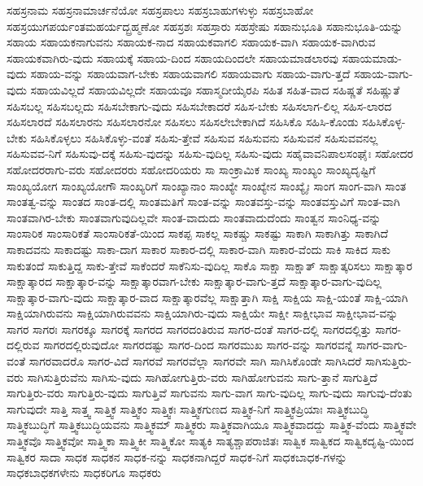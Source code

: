 {ಸಹಸ್ರನಾಮ
ಸಹಸ್ರನಾಮಾರ್ಚನೆಯೋ
ಸಹಸ್ರಪಾಲು
ಸಹಸ್ರಬಾಹುಗಳುಳ್ಳು
ಸಹಸ್ರಬಾಹೋ
ಸಹಸ್ರಯುಗಪರ್ಯಂತಮಹರ್ಯದ್ಬ್ರಹ್ಮಣೋ
ಸಹಸ್ರಶಃ
ಸಹಸ್ರಾರು
ಸಹಸ್ರೇಷು
ಸಹಾನುಭೂತಿ
ಸಹಾನುಭೂತಿ-ಯನ್ನು
ಸಹಾಯ
ಸಹಾಯಕನಾಗುವನು
ಸಹಾಯಕ-ನಾದ
ಸಹಾಯಕವಾಗಲಿ
ಸಹಾಯಕ-ವಾಗಿ
ಸಹಾಯಕ-ವಾಗಿರುವ
ಸಹಾಯಕವಾಗಿರು-ವುದು
ಸಹಾಯಕ್ಕೆ
ಸಹಾಯ-ದಿಂದ
ಸಹಾಯದಿಂದಲೇ
ಸಹಾಯಮಾಡಲಾರವು
ಸಹಾಯಮಾಡು-ವುದು
ಸಹಾಯ-ವನ್ನು
ಸಹಾಯವಾಗ-ಬೇಕು
ಸಹಾಯವಾಗಲಿ
ಸಹಾಯವಾಗು
ಸಹಾಯ-ವಾಗು-ತ್ತದೆ
ಸಹಾಯ-ವಾಗು-ವುದು
ಸಹಾಯವಿಲ್ಲದೆ
ಸಹಾಯವಿಲ್ಲದೇ
ಸಹಾಯವೂ
ಸಹಾಸ್ಮದೀಯೈರಪಿ
ಸಹಿತ
ಸಹಿತ-ವಾದ
ಸಹಿಷ್ಣತೆ
ಸಹಿಷ್ಣುತೆ
ಸಹಿಸಬಲ್ಲ
ಸಹಿಸಬಲ್ಲದು
ಸಹಿಸಬೇಕಾಗು-ವುದು
ಸಹಿಸಬೇಕಾದರೆ
ಸಹಿಸ-ಬೇಕು
ಸಹಿಸಲಾಗ-ಲಿಲ್ಲ
ಸಹಿಸ-ಲಾರದ
ಸಹಿಸಲಾರದೆ
ಸಹಿಸಲಾರನು
ಸಹಿಸಲಾರನೋ
ಸಹಿಸಲು
ಸಹಿಸಲೇಬೇಕಾಗಿದೆ
ಸಹಿಸಿಕೊ
ಸಹಿಸಿ-ಕೊಂಡು
ಸಹಿಸಿಕೊಳ್ಳ-ಬೇಕು
ಸಹಿಸಿಕೊಳ್ಳಲು
ಸಹಿಸಿಕೊಳ್ಳು-ವಂತೆ
ಸಹಿಸು-ತ್ತೇವೆ
ಸಹಿಸುವ
ಸಹಿಸುವನು
ಸಹಿಸುವನೆ
ಸಹಿಸುವವನಲ್ಲ
ಸಹಿಸುವವ-ನಿಗೆ
ಸಹಿಸುವು-ದಕ್ಕೆ
ಸಹಿಸು-ವುದನ್ನು
ಸಹಿಸು-ವುದಿಲ್ಲ
ಸಹಿಸು-ವುದು
ಸಹೈವಾವನಿಪಾಲಸಂಘೈಃ
ಸಹೋದರ
ಸಹೋದರರಾಗು-ವರು
ಸಹೋದರರು
ಸಹೋದರಿಯರು
ಸಾ
ಸಾಂಕ್ರಾಮಿಕ
ಸಾಂಖ್ಯ
ಸಾಂಖ್ಯಂ
ಸಾಂಖ್ಯದೃಷ್ಟಿಗೆ
ಸಾಂಖ್ಯಯೋಗ
ಸಾಂಖ್ಯಯೋಗೌ
ಸಾಂಖ್ಯರಿಗೆ
ಸಾಂಖ್ಯಾನಾಂ
ಸಾಂಖ್ಯೇ
ಸಾಂಖ್ಯೇನ
ಸಾಂಖ್ಯೈಃ
ಸಾಂಗ
ಸಾಂಗ-ವಾಗಿ
ಸಾಂತ
ಸಾಂತತ್ವ-ವನ್ನು
ಸಾಂತದ
ಸಾಂತ-ದಲ್ಲಿ
ಸಾಂತಮತಿಗೆ
ಸಾಂತ-ವನ್ನು
ಸಾಂತವಸ್ತು-ವನ್ನು
ಸಾಂತವಸ್ತುವಿಗೆ
ಸಾಂತ-ವಾಗಿ
ಸಾಂತವಾಗಿರ-ಬೇಕು
ಸಾಂತವಾಗುವುದಿಲ್ಲವೇ
ಸಾಂತ-ವಾದುದು
ಸಾಂತವಾದುದೆಂದು
ಸಾಂತ್ವನ
ಸಾಂನಿಧ್ಯ-ವನ್ನು
ಸಾಂಸಾರಿಕ
ಸಾಂಸಾರಿಕತೆ
ಸಾಂಸಾರಿಕತೆ-ಯಿಂದ
ಸಾಕಪ್ಪ
ಸಾಕಲ್ಲ
ಸಾಕಷ್ಚು
ಸಾಕಷ್ಟು
ಸಾಕಾಗಿ
ಸಾಕಾಗಿತ್ತು
ಸಾಕಾಗಿದೆ
ಸಾಕಾದವನು
ಸಾಕಾದಷ್ಟು
ಸಾಕಾ-ದಾಗ
ಸಾಕಾರ
ಸಾಕಾರ-ದಲ್ಲಿ
ಸಾಕಾರ-ವಾಗಿ
ಸಾಕಾರ-ವೆಂದು
ಸಾಕಿ
ಸಾಕಿದ
ಸಾಕು
ಸಾಕುತಂದೆ
ಸಾಕುತ್ತಿದ್ದ
ಸಾಕು-ತ್ತೇವೆ
ಸಾಕೆಂದರೆ
ಸಾಕೆನಿಸು-ವುದಿಲ್ಲ
ಸಾಕೊ
ಸಾಕ್ಷಾ
ಸಾಕ್ಷಾತ್
ಸಾಕ್ಷಾತ್ಕರಿಸಲು
ಸಾಕ್ಷಾತ್ಕಾರ
ಸಾಕ್ಷಾತ್ಕಾರದ
ಸಾಕ್ಷಾತ್ಕಾರ-ವನ್ನು
ಸಾಕ್ಷಾತ್ಕಾರವಾಗ-ಬೇಕು
ಸಾಕ್ಷಾತ್ಕಾರ-ವಾಗು-ತ್ತದೆ
ಸಾಕ್ಷಾತ್ಕಾರ-ವಾಗು-ವುದಿಲ್ಲ
ಸಾಕ್ಷಾತ್ಕಾರ-ವಾಗು-ವುದು
ಸಾಕ್ಷಾತ್ಕಾರ-ವಾದ
ಸಾಕ್ಷಾತ್ಕಾರವೆಲ್ಲ
ಸಾಕ್ಷಾತ್ತಾಗಿ
ಸಾಕ್ಷಿ
ಸಾಕ್ಷಿಯ
ಸಾಕ್ಷಿ-ಯಂತೆ
ಸಾಕ್ಷಿ-ಯಾಗಿ
ಸಾಕ್ಷಿಯಾಗಿರುವನು
ಸಾಕ್ಷಿಯಾಗಿರುವವನು
ಸಾಕ್ಷಿಯಾಗಿರು-ವುದು
ಸಾಕ್ಷಿಯೇ
ಸಾಕ್ಷೀ
ಸಾಕ್ಷೀಭಾವ
ಸಾಕ್ಷೀಭಾವ-ವನ್ನು
ಸಾಗರ
ಸಾಗರಃ
ಸಾಗರಕ್ಕೂ
ಸಾಗರಕ್ಕೆ
ಸಾಗರದ
ಸಾಗರದಂತಿರುವ
ಸಾಗರ-ದಂತೆ
ಸಾಗರ-ದಲ್ಲಿ
ಸಾಗರದಲ್ಲಿತ್ತು
ಸಾಗರ-ದಲ್ಲಿರುವ
ಸಾಗರದಲ್ಲಿರುವುದೋ
ಸಾಗರದಷ್ಟು
ಸಾಗರ-ದಿಂದ
ಸಾಗರಮುಖ
ಸಾಗರ-ವನ್ನು
ಸಾಗರವನ್ನೆ
ಸಾಗರ-ವಾಗು-ವಂತೆ
ಸಾಗರವಾದರೊ
ಸಾಗರ-ವಿದೆ
ಸಾಗರವೆ
ಸಾಗರವೆಲ್ಲಾ
ಸಾಗರವೇ
ಸಾಗಿ
ಸಾಗಿಸಿಕೊಂಡೇ
ಸಾಗಿಸಿದರೆ
ಸಾಗಿಸುತ್ತಿರು-ವರು
ಸಾಗಿಸುತ್ತಿರುವೆನು
ಸಾಗಿಸು-ವುದು
ಸಾಗಿಹೋಗುತ್ತಿರು-ವರು
ಸಾಗಿಹೋಗುವನು
ಸಾಗು-ತ್ತಾನೆ
ಸಾಗುತ್ತಿದೆ
ಸಾಗುತ್ತಿರು-ವರು
ಸಾಗುತ್ತಿರು-ವುದು
ಸಾಗುತ್ತಿವೆ
ಸಾಗುವನು
ಸಾಗು-ವಾಗ
ಸಾಗು-ವುದಿಲ್ಲ
ಸಾಗು-ವುದು
ಸಾಗುವು-ದೆಂತು
ಸಾಗುವುದೇ
ಸಾತ್ತಿ
ಸಾತ್ತ್ವ
ಸಾತ್ತ್ವಿಕ
ಸಾತ್ತ್ವಿಕಂ
ಸಾತ್ತ್ವಿಕಃ
ಸಾತ್ತ್ವಿಕಗುಣದ
ಸಾತ್ತ್ವಿಕ-ನಿಗೆ
ಸಾತ್ತ್ವಿಕಪ್ರಿಯಾಃ
ಸಾತ್ತ್ವಿಕಬುದ್ಧಿ
ಸಾತ್ತ್ವಿಕಬುದ್ಧಿಗೆ
ಸಾತ್ತ್ವಿಕಬುದ್ಧಿಯವನು
ಸಾತ್ತ್ವಿಕಮ್
ಸಾತ್ತ್ವಿಕರು
ಸಾತ್ತ್ವಿಕವಾಗಿಯೂ
ಸಾತ್ತ್ವಿಕವಾದದ್ದು
ಸಾತ್ತ್ವಿಕ-ವೆಂದು
ಸಾತ್ತ್ವಿಕವೇ
ಸಾತ್ತ್ವಿಕವೊ
ಸಾತ್ತ್ವಿಕವೋ
ಸಾತ್ತ್ವಿಕಾ
ಸಾತ್ತ್ವಿಕೀ
ಸಾತ್ತ್ವಿಕೋ
ಸಾತ್ಯಕಿ
ಸಾತ್ಯಶ್ಚಾಪರಾಜಿತಃ
ಸಾತ್ವಿಕ
ಸಾತ್ವಿಕದ
ಸಾತ್ವಿಕದೃಷ್ಟಿ-ಯಿಂದ
ಸಾತ್ವಿಕರ
ಸಾದಾ
ಸಾಧಕ
ಸಾಧಕನ
ಸಾಧಕ-ನನ್ನು
ಸಾಧಕನಾಗಿದ್ದರೆ
ಸಾಧಕ-ನಿಗೆ
ಸಾಧಕಬಾಧಕ-ಗಳನ್ನು
ಸಾಧಕಬಾಧಕಗಳೇನು
ಸಾಧಕರಿಗೂ
ಸಾಧಕರು
}

